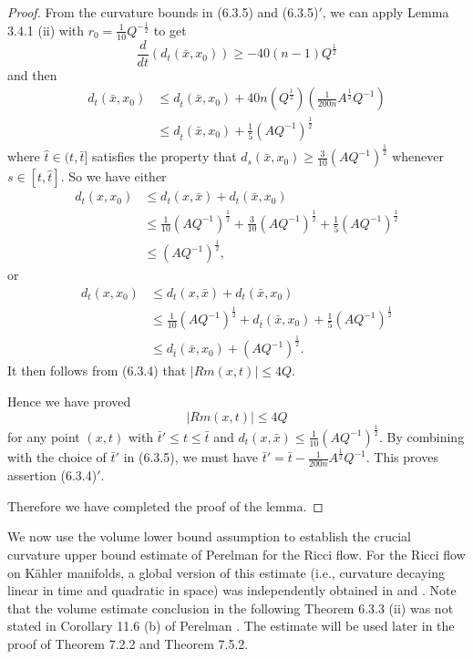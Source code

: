\begin{proof}
\smallskip
{}From the curvature bounds in (6.3.5) and (6.3.5)$'$, we can
apply Lemma 3.4.1 (ii) with $r_0=\frac{1}{10}Q^{-\frac{1}{2}}$ to
get
$$
\frac{d}{dt}(d_t(\bar{x},x_0))\geq -40(n-1)Q^{\frac{1}{2}}
$$
and then
\begin{align*}
d_t(\bar{x},x_0)&  \leq d_{\hat{t}}(\bar{x},x_0)
+40n(Q^{\frac{1}{2}})\left(\frac{1}{200n}A^{\frac{1}{2}}Q^{-1}\right)\\
& \leq d_{\hat{t}}(\bar{x},x_0)+\frac{1}{5}(AQ^{-1})^{\frac{1}{2}}
\end{align*}
where $\hat{t} \in (t,\bar{t}]$ satisfies the property that
$d_s(\bar{x},x_0)\geq \frac{3}{10}(AQ^{-1})^{\frac{1}{2}}$
whenever $s \in [t,\hat{t}]$. So we have either
\begin{align*}
d_t({x},x_0)&  \leq d_t(x,\bar{x})+d_t(\bar{x},x_0)\\
&  \leq \frac{1}{10}(AQ^{-1})^{\frac{1}{2}}
+\frac{3}{10}(AQ^{-1})^{\frac{1}{2}}+\frac{1}{5}(AQ^{-1})^{\frac{1}{2}}\\
&  \leq (AQ^{-1})^{\frac{1}{2}},
\end{align*}
or
\begin{align*}
d_t(x,x_0)&  \leq d_t(x,\bar{x})+d_t(\bar{x},x_0)\\
&  \leq \frac{1}{10}(AQ^{-1})^{\frac{1}{2}}
+d_{\bar{t}}(\bar{x},x_0)+\frac{1}{5}(AQ^{-1})^{\frac{1}{2}} \\
&  \leq d_{\bar{t}}(\bar{x},x_0)+(AQ^{-1})^{\frac{1}{2}}.
\end{align*}
It then follows from (6.3.4) that $|Rm(x,t)|\leq 4Q $.

Hence we have proved
$$
|Rm(x,t)|\leq 4Q
$$
for any point $(x,t)$ with $\bar{t}'\leq t\leq \bar{t}$ and
$d_t(x,\bar{x})\leq \frac{1}{10}(AQ^{-1})^{\frac{1}{2}}$. By
combining with the choice of $\bar{t}'$ in (6.3.5), we must have
$\bar{t}'= \bar{t}-\frac{1}{200n}A^{\frac{1}{2}}Q^{-1}$. This
proves assertion (6.3.4)$'$.

Therefore we have completed the proof of the lemma.
\end{proof}

We now use the volume lower bound assumption to establish the
crucial curvature upper bound estimate of Perelman \cite{P1} for
the Ricci flow. For the Ricci flow on K\"ahler manifolds, a global
version of this estimate (i.e., curvature decaying linear in time
and quadratic in space) was independently obtained in \cite{CTZ04}
and \cite{CZ04}. Note that the volume estimate conclusion in the
following Theorem 6.3.3 (ii) was not stated in Corollary 11.6 (b)
of Perelman \cite{P1}. The estimate will be used later in the
proof of Theorem 7.2.2 and Theorem 7.5.2.

